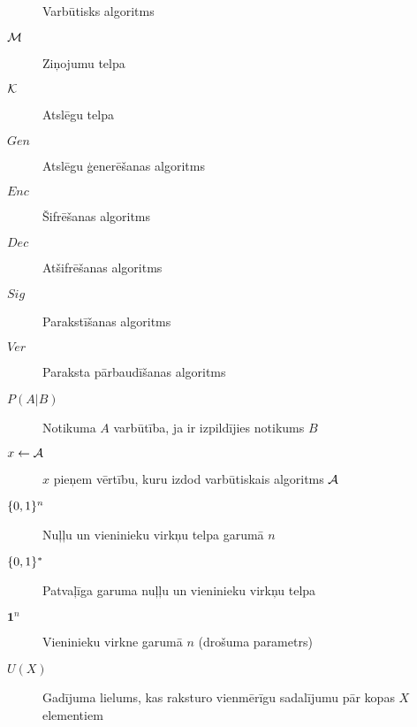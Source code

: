 \begin{description}
    \item[\ppt] Varbūtisks algoritms
    \item[$\mathcal{M}$]Ziņojumu telpa
    \item[$\mathcal{K}$]Atslēgu telpa
    \item[$Gen$]Atslēgu ģenerēšanas algoritms
    \item[$Enc$]Šifrēšanas algoritms
    \item[$Dec$]Atšifrēšanas algoritms
    \item[$Sig$]Parakstīšanas algoritms
    \item[$Ver$]Paraksta pārbaudīšanas algoritms
    \item[$P(A|B)$]Notikuma $A$ varbūtība, ja ir izpildījies notikums $B$
    \item[$x \leftarrow \mathcal{A}$]$x$ pieņem vērtību, kuru izdod varbūtiskais algoritms $\mathcal{A}$
    \item[$\{0,1\}^n$] Nuļļu un vieninieku virkņu telpa garumā $n$ 
    \item[$\{0,1\}^*$]Patvaļīga garuma nuļļu un vieninieku virkņu telpa
    \item[$\mathbf{1}^n$]Vieninieku virkne garumā $n$ (drošuma parametrs)
    \item[$U(X)$] Gadījuma lielums, kas raksturo vienmērīgu sadalījumu pār kopas $X$ elementiem
\end{description}
